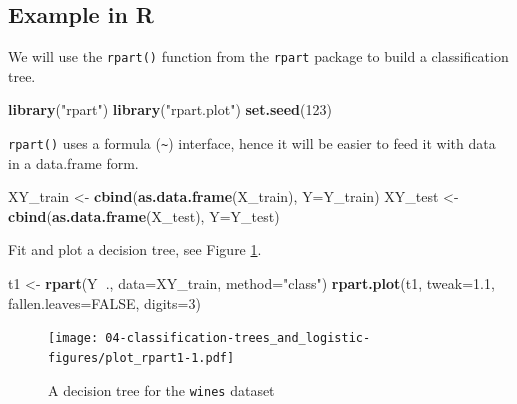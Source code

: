 \documentclass[10pt,b5paper,krantz1]{krantz}
\newenvironment{Shaded}{\begin{snugshade}}{\end{snugshade}}
\newcommand{\DataTypeTok}[1]{\textcolor[rgb]{0.27,0.27,0.27}{#1}}
\newcommand{\DecValTok}[1]{\textcolor[rgb]{0.06,0.06,0.06}{#1}}
\newcommand{\FloatTok}[1]{\textcolor[rgb]{0.06,0.06,0.06}{#1}}
\newcommand{\KeywordTok}[1]{\textcolor[rgb]{0.27,0.27,0.27}{\textbf{#1}}}
\newcommand{\NormalTok}[1]{#1}
\newcommand{\OperatorTok}[1]{\textcolor[rgb]{0.43,0.43,0.43}{\textbf{#1}}}
\newcommand{\OtherTok}[1]{\textcolor[rgb]{0.37,0.37,0.37}{#1}}
\newcommand{\StringTok}[1]{\textcolor[rgb]{0.5,0.5,0.5}{#1}}
\begin{document}
\hypertarget{example-in-r-1}{%
\subsection{Example in R}\label{example-in-r-1}}

We will use the \texttt{rpart()} function from the \texttt{rpart} package
to build a classification tree.

\begin{Shaded}
\begin{Highlighting}[]
\KeywordTok{library}\NormalTok{(}\StringTok{"rpart"}\NormalTok{)}
\KeywordTok{library}\NormalTok{(}\StringTok{"rpart.plot"}\NormalTok{)}
\KeywordTok{set.seed}\NormalTok{(}\DecValTok{123}\NormalTok{)}
\end{Highlighting}
\end{Shaded}

\texttt{rpart()} uses a formula (\texttt{\textasciitilde{}}) interface, hence it will be easier
to feed it with data in a data.frame form.

\begin{Shaded}
\begin{Highlighting}[]
\NormalTok{XY_train <-}\StringTok{ }\KeywordTok{cbind}\NormalTok{(}\KeywordTok{as.data.frame}\NormalTok{(X_train), }\DataTypeTok{Y=}\NormalTok{Y_train)}
\NormalTok{XY_test <-}\StringTok{ }\KeywordTok{cbind}\NormalTok{(}\KeywordTok{as.data.frame}\NormalTok{(X_test), }\DataTypeTok{Y=}\NormalTok{Y_test)}
\end{Highlighting}
\end{Shaded}

Fit and plot a decision tree, see Figure \ref{fig:plot_rpart1}.

\begin{Shaded}
\begin{Highlighting}[]
\NormalTok{t1 <-}\StringTok{ }\KeywordTok{rpart}\NormalTok{(Y}\OperatorTok{~}\NormalTok{., }\DataTypeTok{data=}\NormalTok{XY_train, }\DataTypeTok{method=}\StringTok{"class"}\NormalTok{)}
\KeywordTok{rpart.plot}\NormalTok{(t1, }\DataTypeTok{tweak=}\FloatTok{1.1}\NormalTok{, }\DataTypeTok{fallen.leaves=}\OtherTok{FALSE}\NormalTok{, }\DataTypeTok{digits=}\DecValTok{3}\NormalTok{)}
\end{Highlighting}
\end{Shaded}

\begin{figure}
\hypertarget{fig:plot_rpart1}{%
\centering
\texttt{[image: 04-classification-trees\_and\_logistic-figures/plot\_rpart1-1.pdf]}
\caption{A decision tree for the \texttt{wines} dataset}\label{fig:plot_rpart1}
}
\end{figure}
\end{document}
